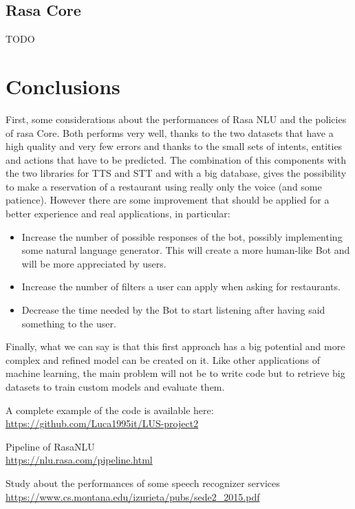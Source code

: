 \documentclass[11pt,a4paper]{article}
\begin{document}
\subsection{Rasa Core}

TODO


\section{Conclusions}

First, some considerations about the performances of Rasa NLU and the policies of rasa Core. Both performs very well, thanks to the two datasets that have a high quality and very few errors and thanks to the small sets of intents, entities and actions that have to be predicted. The combination of this components with the two libraries for TTS and STT and with a big database, gives the possibility to make a reservation of a restaurant using really only the voice (and some patience). However there are some improvement that should be applied for a better experience and real applications, in particular:
\begin{itemize}
\item Increase the number of possible responses of the bot, possibly implementing some natural language generator. This will create a more human-like Bot and will be more appreciated by users.
\item Increase the number of filters a user can apply when asking for restaurants.
\item Decrease the time needed by the Bot to start listening after having said something to the user.
\end{itemize}
Finally, what we can say is that this first approach has a big potential and more complex and refined model can be created on it. Like other applications of machine learning, the main problem will not be to write code but to retrieve big datasets to train custom models and evaluate them.

A complete example of the code is available here: \url{https://github.com/Luca1995it/LUS-project2}

\bigskip


\begin{thebibliography}{2}

Pipeline of RasaNLU \\
\url{https://nlu.rasa.com/pipeline.html}

Study about the performances of some speech recognizer services \\
\url{https://www.cs.montana.edu/izurieta/pubs/sede2_2015.pdf}


\end{thebibliography}
\end{document}
